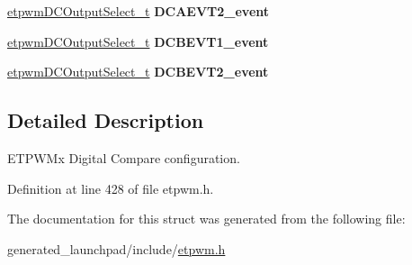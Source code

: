 \begin{DoxyCompactItemize}
\item 
\mbox{\label{structetpwmDigitalCompareConfig__t_ac1e52a1a87d4228cc78218f30967e14c}} 
\mbox{\hyperlink{etpwm_8h_a320d139cfe64e8a4bd00653a21aa6a7f}{etpwm\+D\+C\+Output\+Select\+\_\+t}} {\bfseries D\+C\+A\+E\+V\+T2\+\_\+event}
\item 
\mbox{\label{structetpwmDigitalCompareConfig__t_ae3a0a7fc3254bbf047caa3dc8f7015d9}} 
\mbox{\hyperlink{etpwm_8h_a320d139cfe64e8a4bd00653a21aa6a7f}{etpwm\+D\+C\+Output\+Select\+\_\+t}} {\bfseries D\+C\+B\+E\+V\+T1\+\_\+event}
\item 
\mbox{\label{structetpwmDigitalCompareConfig__t_a4ee38d7c64340dc925198985e30b8725}} 
\mbox{\hyperlink{etpwm_8h_a320d139cfe64e8a4bd00653a21aa6a7f}{etpwm\+D\+C\+Output\+Select\+\_\+t}} {\bfseries D\+C\+B\+E\+V\+T2\+\_\+event}
\end{DoxyCompactItemize}


\subsection{Detailed Description}
E\+T\+P\+W\+Mx Digital Compare configuration. 

Definition at line 428 of file etpwm.\+h.



The documentation for this struct was generated from the following file\+:\begin{DoxyCompactItemize}
\item 
generated\+\_\+launchpad/include/\mbox{\hyperlink{etpwm_8h}{etpwm.\+h}}\end{DoxyCompactItemize}
